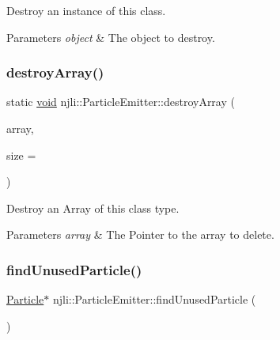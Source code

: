Destroy an instance of this class.


\begin{DoxyParams}{Parameters}
{\em object} & The object to destroy. \\
\hline
\end{DoxyParams}
\mbox{\label{classnjli_1_1_particle_emitter_ad802fa0111238cb87cd78cdb7242793d}} 
\subsubsection{\texorpdfstring{destroy\+Array()}{destroyArray()}}
{\footnotesize\ttfamily static \mbox{\hyperlink{_thread_8h_af1e856da2e658414cb2456cb6f7ebc66}{void}} njli\+::\+Particle\+Emitter\+::destroy\+Array (\begin{DoxyParamCaption}\item[{\mbox{\hyperlink{classnjli_1_1_particle_emitter}{Particle\+Emitter}} $\ast$$\ast$}]{array,  }\item[{const \mbox{\hyperlink{_util_8h_a10e94b422ef0c20dcdec20d31a1f5049}{u32}}}]{size = {} }\end{DoxyParamCaption})\hspace{0.3cm}{\ttfamily [static]}}

Destroy an Array of this class type.


\begin{DoxyParams}{Parameters}
{\em array} & The Pointer to the array to delete. \\
\hline
\end{DoxyParams}
\mbox{\label{classnjli_1_1_particle_emitter_afb4769ebda101a59874157382f83d8b0}} 
\subsubsection{\texorpdfstring{find\+Unused\+Particle()}{findUnusedParticle()}}
{\footnotesize\ttfamily \mbox{\hyperlink{structnjli_1_1_particle_emitter_1_1_particle}{Particle}}$\ast$ njli\+::\+Particle\+Emitter\+::find\+Unused\+Particle (\begin{DoxyParamCaption}{ }\end{DoxyParamCaption})\hspace{0.3cm}{\ttfamily [private]}}


